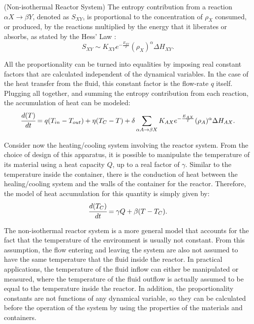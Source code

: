 \documentclass[a4paper,11pt]{book}
\numberwithin{figure}{chapter}
\numberwithin{equation}{chapter}
\numberwithin{table}{chapter}
\theoremstyle{definition}
\newtheorem{example}{Example}[chapter]
\newcounter{boxed-theorem}
\newcounter{boxed-lemma}
\newcounter{boxed-definition}
\newcounter{boxed-example}
\newenvironment{boxed-example}[1]
{\colorlet{shadecolor}{pastelRed!15} \begin{shaded} \begin{example}{#1}}
{\end{example} \end{shaded}}
\begin{document}
\begin{boxed-example}{(Non-isothermal Reactor System)}
    The entropy contribution from a reaction $\alpha X \rightarrow \beta Y$, denoted as $S_{XY}$, is proportional to the concentration of $\rho_X$ consumed, or produced, by the reactions multiplied by the energy that it liberates or absorbs, as stated by the Hess' Law \cite{Atkins:2011}:
    \begin{equation}
        S_{XY} \sim K_{XY} e^{-\frac{E_{XY}}{T}} (\rho_X)^{\alpha} \Delta H_{XY}
    .\end{equation}

    All the proportionality can be turned into equalities by imposing real constant factors that are calculated independent of the dynamical variables. In the case of the heat transfer from the fluid, this constant factor is the flow-rate $q$ itself. Plugging all together, and summing the entropy contribution from each reaction, the accumulation of heat can be modeled:
    \begin{equation}
        \cfrac{d(T)}{dt} = q(T_{in} - T_{out}) + \eta (T_C - T) + \delta \sum_{\alpha A \rightarrow \beta X} K_{AX} e^{-\frac{E_{AX}}{T}} (\rho_A)^{\alpha} \Delta H_{AX}
    .\end{equation}
    
    Consider now the heating/cooling system involving the reactor system. From the choice of design of this apparatus, it is possible to manipulate the temperature of its material using a heat capacity $Q$, up to a real factor of $\gamma$. Similar to the temperature inside the container, there is the conduction of heat between the healing/cooling system and the walls of the container for the reactor. Therefore, the model of heat accumulation for this quantity is simply given by:
    \begin{equation}
        \cfrac{d(T_C)}{dt} = \gamma Q + \beta (T - T_C)
    .\end{equation}
\end{boxed-example}

The non-isothermal reactor system is a more general model that accounts for the fact that the temperature of the environment is usually not constant. From this assumption, the flow entering and leaving the system are also not assumed to have the same temperature that the fluid inside the reactor. In practical applications, the temperature of the fluid inflow can either be manipulated or measured, where the temperature of the fluid outflow is actually assumed to be equal to the temperature inside the reactor. In addition, the proportionality constants are not functions of any dynamical variable, so they can be calculated before the operation of the system by using the properties of the materials and containers.
\end{document}
